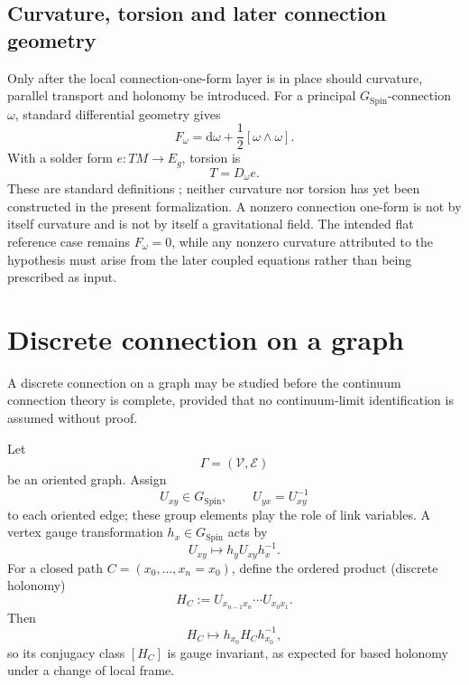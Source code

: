 \documentclass[11pt,a4paper]{article}
\theoremstyle{remark}
\newcommand{\SpinG}{G_{\mathrm{Spin}}}
\newcommand{\dd}{\mathrm d}
\begin{document}
\subsection{Curvature, torsion and later connection geometry}

Only after the local connection-one-form layer is in place should curvature, parallel transport and holonomy be introduced.  For a principal \(\SpinG\)-connection \(\omega\), standard differential geometry gives
\begin{equation}
  F_{\omega}
  =\dd\omega+\frac12[\omega\wedge\omega].
\tag{4.24}
\end{equation}
With a solder form \(e:TM\to E_g\), torsion is
\begin{equation}
  T=D_{\omega}e.
\tag{4.25}
\end{equation}
These are standard definitions \cite{KobayashiNomizu,Nakahara2003}; neither curvature nor torsion has yet been constructed in the present formalization.  A nonzero connection one-form is not by itself curvature and is not by itself a gravitational field.  The intended flat reference case remains \(F_\omega=0\), while any nonzero curvature attributed to the hypothesis must arise from the later coupled equations rather than being prescribed as input.

\section{Discrete connection on a graph}

A discrete connection on a graph may be studied before the continuum connection theory is complete, provided that no continuum-limit identification is assumed without proof.

Let
\begin{equation}
  \Gamma=(\mathcal V,\mathcal E)
\tag{5.1}
\end{equation}
be an oriented graph.  Assign
\begin{equation}
  U_{xy}\in\SpinG,
  \qquad
  U_{yx}=U_{xy}^{-1}
\tag{5.2}
\end{equation}
to each oriented edge; these group elements play the role of link variables.  A vertex gauge transformation \(h_x\in\SpinG\) acts by
\begin{equation}
  U_{xy}\longmapsto h_yU_{xy}h_x^{-1}.
\tag{5.3}
\end{equation}
For a closed path \(C=(x_0,\ldots,x_n=x_0)\), define the ordered product (discrete holonomy)
\begin{equation}
  H_C:=U_{x_{n-1}x_n}\cdots U_{x_0x_1}.
\tag{5.4}
\end{equation}
Then
\begin{equation}
  H_C\longmapsto h_{x_0}H_Ch_{x_0}^{-1},
\tag{5.5}
\end{equation}
so its conjugacy class \([H_C]\) is gauge invariant, as expected for based holonomy under a change of local frame.
\end{document}

